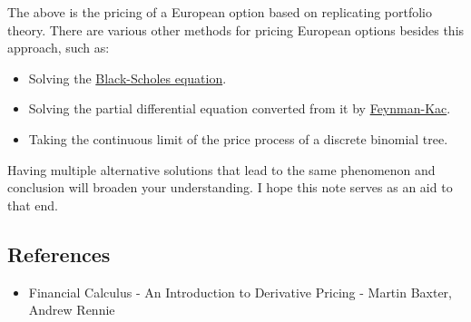 \documentclass[uplatex,a4j,12pt,dvipdfmx]{jsarticle}
\begin{document}
The above is the pricing of a European option based on replicating portfolio theory.
There are various other methods for pricing European options besides this approach, such as:
\begin{itemize}
	\item Solving the \href{https://en.wikipedia.org/wiki/Black%E2%80%93Scholes_equation}{Black-Scholes equation}.
	\item Solving the partial differential equation converted from it by \href{https://en.wikipedia.org/wiki/Feynman%E2%80%93Kac_formula}{Feynman-Kac}.
	\item Taking the continuous limit of the price process of a discrete binomial tree.
\end{itemize}
Having multiple alternative solutions that lead to the same phenomenon and conclusion will broaden your understanding. I hope this note serves as an aid to that end.

\subsection{References}
\begin{itemize}
	\item Financial Calculus - An Introduction to Derivative Pricing - Martin Baxter, Andrew Rennie
\end{itemize}
\end{document}
